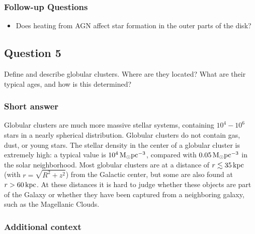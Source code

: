 \documentclass[a4paper,11pt]{article}
\begin{document}
\subsubsection{Follow-up Questions}

\begin{itemize}
    \item Does heating from AGN affect star formation in the outer parts of the disk?
\end{itemize}


\newpage
\subsection{Question 5}

Define and describe globular clusters. Where are they located? What are their typical ages, and how is this determined?

\subsubsection{Short answer}

Globular clusters are much more massive stellar systems, containing $10^4-10^6$ stars in a nearly spherical distribution. Globular clusters do not contain gas, dust, or young stars. The stellar density in the center of a globular cluster is extremely high: a typical value is $10^4\,{\rm M_\odot pc^{-3}}$, compared with $0.05\,{\rm M_\odot pc^{-3}}$ in the solar neighborhood. Most globular clusters are at a distance of $r\lesssim35\,{\rm kpc}$ (with $r=\sqrt{R^2+z^2}$) from the Galactic center, but some are also found at $r>60\,{\rm kpc}$. At these distances it is hard to judge whether these objects are part of the Galaxy or whether they have been captured from a neighboring galaxy, such as the Magellanic Clouds.

\subsubsection{Additional context}
\end{document}
